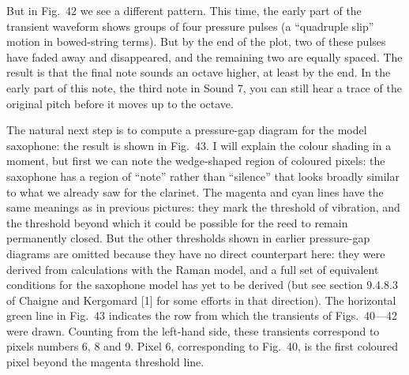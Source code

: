 
  But in Fig.\ 42 we see a different pattern. This time, the early part of the 
  transient waveform shows groups of four pressure pulses (a “quadruple slip” 
  motion in bowed-string terms). But by the end of the plot, two of these 
  pulses have faded away and disappeared, and the remaining two are equally 
  spaced. The result is that the final note sounds an octave higher, at least 
  by the end. In the early part of this note, the third note in Sound 7, you 
  can still hear a trace of the original pitch before it moves up to the 
  octave. 

  The natural next step is to compute a pressure-gap diagram for the model 
  saxophone: the result is shown in Fig.\ 43. I will explain the colour shading 
  in a moment, but first we can note the wedge-shaped region of coloured 
  pixels: the saxophone has a region of “note” rather than “silence” that looks 
  broadly similar to what we already saw for the clarinet. The magenta and cyan 
  lines have the same meanings as in previous pictures: they mark the threshold 
  of vibration, and the threshold beyond which it could be possible for the 
  reed to remain permanently closed. But the other thresholds shown in earlier 
  pressure-gap diagrams are omitted because they have no direct counterpart 
  here: they were derived from calculations with the Raman model, and a full 
  set of equivalent conditions for the saxophone model has yet to be derived 
  (but see section 9.4.8.3 of Chaigne and Kergomard [1] for some efforts in 
  that direction). The horizontal green line in Fig.\ 43 indicates the row from 
  which the transients of Figs.\ 40—42 were drawn. Counting from the left-hand 
  side, these transients correspond to pixels numbers 6, 8 and 9. Pixel 6, 
  corresponding to Fig.\ 40, is the first coloured pixel beyond the magenta 
  threshold line. 


